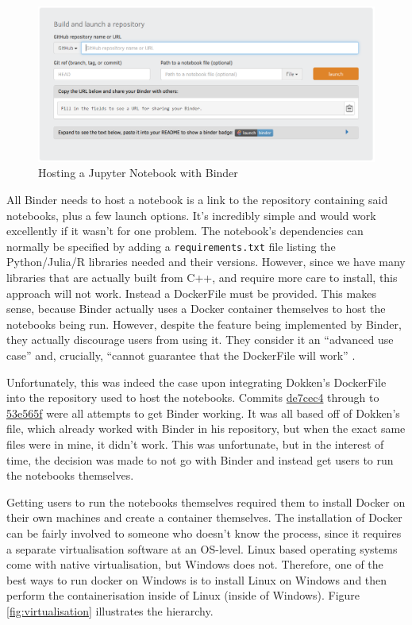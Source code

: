 \begin{figure}[h]
\centering
\includegraphics[scale=0.4]{./images/misc/binder}
\caption{Hosting a Jupyter Notebook with Binder} \label{fig:binder}
\end{figure}

All Binder needs to host a notebook is a link to the repository containing said notebooks, plus a few launch options. It's incredibly simple and would work excellently if it wasn't for one problem. The notebook's dependencies can normally be specified by adding a \texttt{requirements.txt} file listing the Python/Julia/R libraries needed and their versions. However, since we have many libraries that are actually built from C++, and require more care to install, this approach will not work. Instead a DockerFile must be provided. This makes sense, because Binder actually uses a Docker container themselves to host the notebooks being run. However, despite the feature being implemented by Binder, they actually discourage users from using it. They consider it an ``advanced use case'' and, crucially, ``cannot guarantee that the DockerFile will work'' \cite{binder-dockerfile-guide}.

Unfortunately, this was indeed the case upon integrating Dokken's DockerFile into the repository used to host the notebooks. Commits \href{https://github.com/Crypto84/FEMLearningResources/commit/de7cec4592aa68bc6e625533d709ff799cfe6452}{de7cec4} through to \href{https://github.com/Crypto84/FEMLearningResources/commit/53e565f6008c000b9800c41ae86256a9d95364e4}{53e565f} were all attempts to get Binder working. It was all based off of Dokken's file, which already worked with Binder in his repository, but when the exact same files were in mine, it didn't work. This was unfortunate, but in the interest of time, the decision was made to not go with Binder and instead get users to run the notebooks themselves.

Getting users to run the notebooks themselves required them to install Docker on their own machines and create a container themselves. The installation of Docker can be fairly involved to someone who doesn't know the process, since it requires a separate virtualisation software at an OS-level. Linux based operating systems come with native virtualisation, but Windows does not. Therefore, one of the best ways to run docker on Windows is to install Linux on Windows and then perform the containerisation inside of Linux (inside of Windows). Figure \ref{fig:virtualisation} illustrates the hierarchy.

